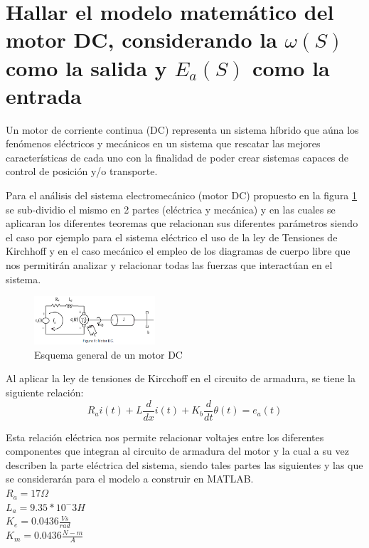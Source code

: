\documentclass[conference]{IEEEtran}
\begin{document}
	\section{Hallar el modelo matemático del motor DC, considerando la $\omega (S)$ como la salida y $E_a(S)$ como la entrada}
	
	Un motor de corriente continua (DC) representa un sistema híbrido que aúna los fenómenos eléctricos y mecánicos en un sistema que rescatar las mejores características de cada uno con la finalidad de poder crear sistemas capaces de control de posición y/o transporte.
	
	Para el análisis del sistema electromecánico (motor DC) propuesto en la figura \ref{fig:motor-electromecanico} se sub-dividio el mismo en 2 partes (eléctrica y mecánica) y en las cuales se aplicaran los diferentes teoremas que relacionan sus diferentes parámetros siendo el caso por ejemplo para el sistema eléctrico el uso de la ley de Tensiones de Kirchhoff y en el caso mecánico el empleo de los diagramas de cuerpo libre que nos permitirán analizar y relacionar todas las fuerzas que interactúan en el sistema.
	
	\begin{figure}[h]
		\centering
		\includegraphics[width=0.4\textwidth]{media/motor-electromecanico}
		\caption{Esquema general de un motor DC}
		\label{fig:motor-electromecanico}
	\end{figure}
	
	Al aplicar la ley de tensiones de Kircchoff en el circuito de armadura, se tiene la siguiente relación:
	\begin{equation}
		R_ai(t) + L\frac{d}{dx} i(t) + K_b \frac{d}{dt} \theta (t) = e_a(t)
		\label{eq:malla-1}
	\end{equation}
	
	Esta relación eléctrica nos permite relacionar voltajes entre los diferentes componentes que integran al circuito de armadura del motor y la cual a su vez describen la parte eléctrica del sistema, siendo tales partes las siguientes y las que se considerarán para el modelo a construir en MATLAB. \\
	
	$R_a = 17 \Omega$ \\
	$L_a = 9.35*10^-3 H$ \\
	$K_e = 0.0436 \frac{Vs}{rad}$ \\
	$K_m = 0.0436 \frac{N-m}{A}$ \\
	
\end{document}

